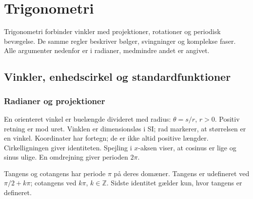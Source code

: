 \chapter{Trigonometri}
\label{ch:trigonometri}
Trigonometri forbinder vinkler med projektioner, rotationer og periodisk
bevægelse. De samme regler beskriver bølger, svingninger og komplekse faser.
Alle argumenter nedenfor er i radianer, medmindre andet er angivet.

\section{Vinkler, enhedscirkel og standardfunktioner}
\label{sec:trigonometri}
\subsection{Radianer og projektioner}
En orienteret vinkel er buelængde divideret med radius: $\theta=s/r$,
$r>0$. Positiv retning er mod uret. Vinklen er dimensionsløs i SI;
rad markerer, at størrelsen er en vinkel.
Koordinater har fortegn; de er ikke altid positive længder.
Cirkelligningen giver identiteten. Spejling i $x$-aksen viser, at cosinus
er lige og sinus ulige. En omdrejning giver perioden $2\pi$.



Tangens og cotangens har periode $\pi$ på deres domæner. Tangens er
udefineret ved $\pi/2+k\pi$; cotangens ved $k\pi$, $k\in\mathbb Z$.
Sidste identitet gælder kun, hvor tangens er defineret.



